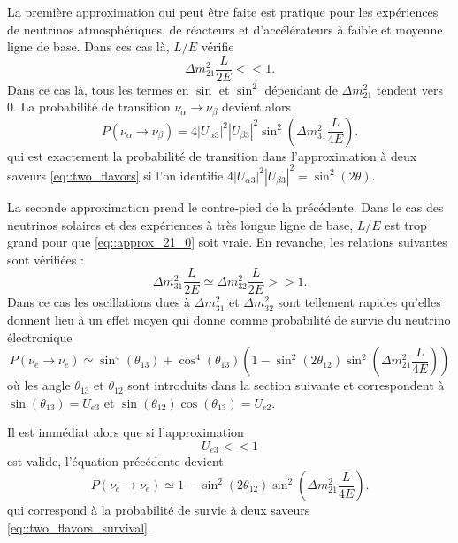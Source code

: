             La première approximation qui peut être faite est pratique pour les expériences de neutrinos atmosphériques, de réacteurs et d'accélérateurs à faible et moyenne ligne de base. Dans ces cas là, $L/E$ vérifie
            \begin{equation}\label{eq::approx_21_0}
                \Delta m^2_{21}\frac{L}{2E} << 1.
            \end{equation}
            Dans ce cas là, tous les termes en $\sin$ et $\sin^2$ dépendant de $\Delta m^2_{21}$ tendent vers 0. La probabilité de transition $\nu_{\alpha}\to\nu_{\beta}$ devient alors
            \begin{equation}
                P(\nu_{\alpha}\to\nu_{\beta}) = 4|U_{\alpha 3}|^2|U_{\beta 3}|^2\sin^2\left(\Delta m^2_{31}\frac{L}{4E}\right).
            \end{equation}
            qui est exactement la probabilité de transition dans l'approximation à deux saveurs \eqref{eq::two_flavors} si l'on identifie $4|U_{\alpha 3}|^2|U_{\beta 3}|^2=\sin^2(2\theta)$.
            
            La seconde approximation prend le contre-pied de la précédente. Dans le cas des neutrinos solaires et des expériences à très longue ligne de base, $L/E$ est trop grand pour que \eqref{eq::approx_21_0} soit vraie. En revanche, les relations suivantes sont vérifiées : 
            \begin{equation}\label{eq::approx_31_eq_32}
                \Delta m^2_{31}\frac{L}{2E} \simeq \Delta m^2_{32}\frac{L}{2E}  >> 1.
            \end{equation}
            Dans ce cas les oscillations dues à $\Delta m^2_{31}$ et $\Delta m^2_{32}$ sont tellement rapides qu'elles donnent lieu à un effet moyen qui donne comme probabilité de survie du neutrino électronique
            \begin{equation}
                P(\nu_e\to\nu_e) \simeq \sin^4(\theta_{13}) + \cos^4(\theta_{13})\left(1-\sin^2(2\theta_{12})\sin^2\left(\Delta m^2_{21}\frac{L}{4E}\right)\right)
            \end{equation}
            où les angle $\theta_{13}$ et $\theta_{12}$ sont introduits dans la section suivante et correspondent à $\sin(\theta_{13})=U_{e3}$ et $\sin(\theta_{12})\cos(\theta_{13})=U_{e2}$.
            
            Il est immédiat alors que si l'approximation 
            \begin{equation}\label{eq::approx_13_eq_0}
                U_{e3} << 1
            \end{equation}
            est valide, l'équation précédente devient
            \begin{equation}\label{eq::solar_oscillation}
                P(\nu_e\to\nu_e) \simeq 1-\sin^2(2\theta_{12})\sin^2\left(\Delta m^2_{21}\frac{L}{4E}\right).
            \end{equation}
            qui correspond à la probabilité de survie à deux saveurs \eqref{eq::two_flavors_survival}.
            
